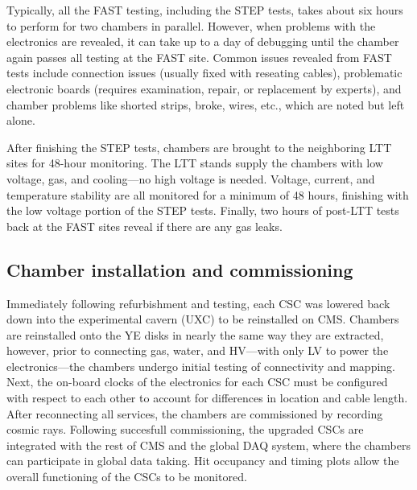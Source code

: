Typically, all the FAST testing, including the STEP tests, takes about six hours to perform for two chambers in parallel. However, when problems with the electronics are revealed, it can take up to a day of debugging until the chamber again passes all testing at the FAST site. Common issues revealed from FAST tests include connection issues (usually fixed with reseating cables), problematic electronic boards (requires examination, repair, or replacement by experts), and chamber problems like shorted strips, broke, wires, etc., which are noted but left alone.

After finishing the STEP tests, chambers are brought to the neighboring LTT sites for 48-hour monitoring. The LTT stands supply the chambers with low voltage, gas, and cooling---no high voltage is needed. Voltage, current, and temperature stability are all monitored for a minimum of 48 hours, finishing with the low voltage portion of the STEP tests. Finally, two hours of post-LTT tests back at the FAST sites reveal if there are any gas leaks.

\subsection{Chamber installation and commissioning} \label{sec:CSCInstallationAndCommissioning}

Immediately following refurbishment and testing, each CSC was lowered back down into the experimental cavern (UXC) to be reinstalled on CMS. Chambers are reinstalled onto the YE disks in nearly the same way they are extracted, however, prior to connecting gas, water, and HV---with only LV to power the electronics---the chambers undergo initial testing of connectivity and mapping. Next, the on-board clocks of the electronics for each CSC must be configured with respect to each other to account for differences in location and cable length. After reconnecting all services, the chambers are commissioned by recording cosmic rays. Following succesfull commissioning, the upgraded CSCs are integrated with the rest of CMS and the global DAQ system, where the chambers can participate in global data taking. Hit occupancy and timing plots allow the overall functioning of the CSCs to be monitored.

